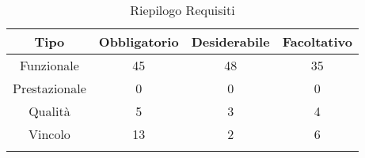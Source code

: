 \normalsize
\begin{longtable}{|c|c|c|c|}
\hline
\textbf{Tipo} & \textbf{Obbligatorio} & \textbf{Desiderabile} & \textbf{Facoltativo}\\
\hline
Funzionale & 45 & 48 & 35\\ \hline
Prestazionale & 0 & 0 & 0\\ \hline
Qualità & 5 & 3 & 4\\ \hline
Vincolo & 13 & 2 & 6\\ \hline
\caption[Riepilogo Requisiti]{Riepilogo Requisiti}
\label{tabella:riepilogorequi}
\end{longtable}
\clearpage
